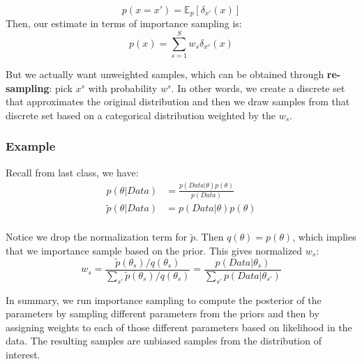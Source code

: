 \documentclass{article}
\begin{document}
\[p(x=x') = \mathbb{E}_p[\delta_{x'}(x)]\]
Then, our estimate in terms of importance sampling is:
\[p(x) = \sum_{s=1}^S w_s \delta_{x^s}(x)\]

But we actually want unweighted samples, which can be obtained through \textbf{re-sampling}: pick $x^s$ with probability $w^s$. In other words, we create a discrete set that approximates the original distribution and then we draw samples from that discrete set based on a categorical distribution weighted by the $w_s$. 

\subsubsection{Example} Recall from last class, we have:
\begin{align*}
    p(\theta | Data) &= \frac{p(Data|\theta)p(\theta)}{p(Data)} \\
    \tilde{p}(\theta | Data) &= p(Data|\theta)p(\theta) \\
\end{align*}

Notice we drop the normalization term for $\tilde{p}$. Then $q(\theta) = p(\theta)$, which implies that we importance sample based on the prior. This gives normalized $w_s$:
\[
w_s = \frac{\tilde{p}(\theta_s)/{q}(\theta_s)}{\sum_{s'} \tilde{p}(\theta_s)/{q}(\theta_s)} =\frac{p(Data| \theta_s)}{\sum_{s'} p(Data|\theta_{s'}) }
\]

In summary, we run importance sampling to compute the posterior of the parameters by sampling different parameters from the priors and then by assigning weights to each of those different parameters based on likelihood in the data. The resulting samples are unbiased samples from the distribution of interest. 
\end{document}
